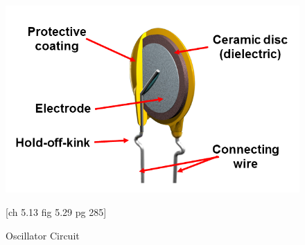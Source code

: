 \begin{figure}
\includegraphics[keepaspectratio=true,scale=.5]{./figures/parameters/oscillator.png}
\centering
\caption{Oscillator Circuit}
\cite{hh}[ch 5.13 fig 5.29 pg 285]
\label{oscillator}
\end{figure}
